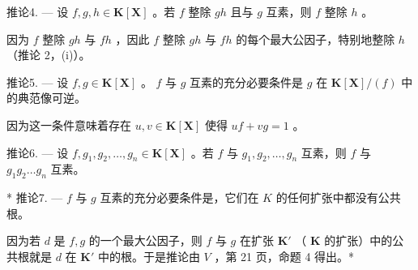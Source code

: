 推论4. --- 设 \(f, g, h \in \mathbf{K}[\mathbf{X}]\) 。若 \(f\) 整除 \(gh\) 且与 \(g\) 互素，则 \(f\) 整除 \(h\) 。

因为 \(f\) 整除 \(gh\) 与 \(fh\) ，因此 \(f\) 整除 \(gh\) 与 \(fh\) 的每个最大公因子，特别地整除 \(h\) （推论 2，(i)）。

推论5. --- 设 \(f, g \in \mathbf{K}[\mathbf{X}]\) 。 \(f\) 与 \(g\) 互素的充分必要条件是 \(g\) 在 \(\mathbf{K}[\mathbf{X}] / (f)\) 中的典范像可逆。

因为这一条件意味着存在 \(u, v \in \mathbf{K}[\mathbf{X}]\) 使得 \(uf + vg = 1\) 。

推论6. --- 设 \(f, g_1, g_2, \ldots, g_n \in \mathbf{K}[\mathbf{X}]\) 。若 \(f\) 与 \(g_1, g_2, \ldots, g_n\) 互素，则 \(f\) 与 \(g_1g_2\ldots g_n\) 互素。

* 推论7. --- \(f\) 与 \(g\) 互素的充分必要条件是，它们在 \(K\) 的任何扩张中都没有公共根。

因为若 \(d\) 是 \(f, g\) 的一个最大公因子，则 \(f\) 与 \(g\) 在扩张 \(\mathbf{K}'\) （ \(\mathbf{K}\) 的扩张）中的公共根就是 \(d\) 在 \(\mathbf{K}'\) 中的根。于是推论由 \(V\) ，第 21 页，命题 4 得出。*

